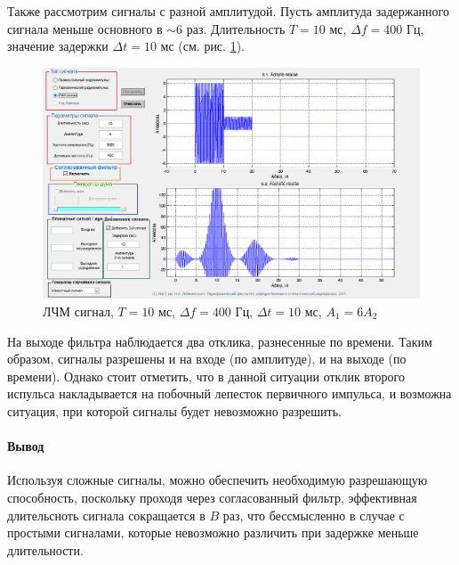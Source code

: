 Также рассмотрим сигналы с разной амплитудой. Пусть амплитуда задержанного сигнала меньше основного в $\sim 6$ раз.
Длительность $T=10$ мс, $\Delta f=400$ Гц, значение задержки $\Delta t = 10$ мс (см. рис. \ref{fig:t5s21_dur10_del10_dev400_amp6}).
\begin{figure}[H]
    \centering
    \includegraphics[width=0.6\linewidth]{imgs/task5/lfm_dev400/6amp/t5s21_dur10_del10_dev400_amp6.png}
    \caption{ЛЧМ сигнал, $T=10$ мс, $\Delta f=400$ Гц, $\Delta t=10$ мс, $A_1 = 6A_2$}
    \label{fig:t5s21_dur10_del10_dev400_amp6}
\end{figure}
На выходе фильтра наблюдается два отклика, разнесенные по времени. Таким образом, сигналы разрешены и на входе (по
амплитуде), и на выходе (по времени). Однако стоит отметить, что в данной ситуации отклик второго испульса накладывается
на побочный лепесток первичного импульса, и возможна ситуация, при которой сигналы будет невозможно разрешить.

\paragraph{Вывод}
Используя сложные сигналы, можно обеспечить необходимую разрешающую способность, поскольку проходя через согласованный
фильтр, эффективная длительсноть сигнала сокращается в $B$ раз, что бессмысленно в случае с простыми сигналами, которые
невозможно различить при задержке меньше длительности.